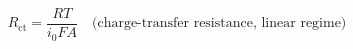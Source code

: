 \documentclass[preview]{standalone}
\begin{document}
\[R_\text{ct} = \frac{RT}{i_0 F A} \quad \text{(charge-transfer resistance, linear regime)} \tag{2.13}\]
\end{document}
